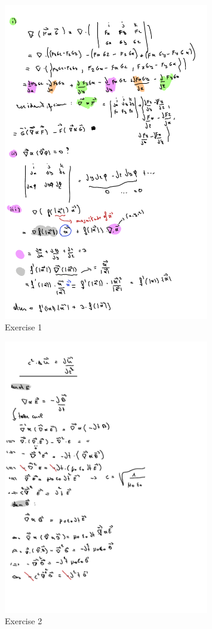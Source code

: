 \documentclass[a4paper]{report}
\begin{document}
\begin{figure}[H]
	\centering
	\includegraphics[width=0.8\textwidth]{assets/huis_6_ex_1.pdf}
	\caption{Exercise 1}
	\label{fig:huis_6_ex_1}
\end{figure}


\begin{figure}[H]
	\centering
	\includegraphics[width=0.8\textwidth]{assets/huis_6_ex_2.pdf}
	\caption{Exercise 2}
	\label{fig:huis_6_ex_2}
\end{figure}
\end{document}
